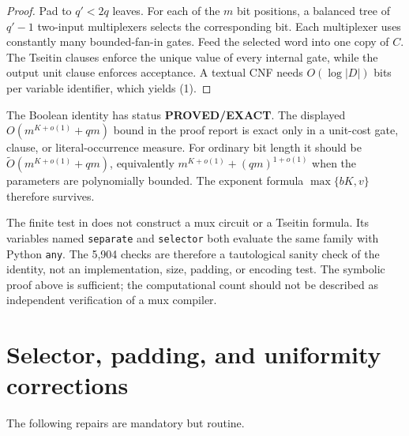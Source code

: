 \documentclass[11pt]{article}
\newcommand{\EXACT}{\textcolor{exact}{\textbf{PROVED/EXACT}}}
\begin{document}
\begin{proof}
Pad to $q'<2q$ leaves.  For each of the $m$ bit positions, a balanced tree of
$q'-1$ two-input multiplexers selects the corresponding bit.  Each
multiplexer uses constantly many bounded-fan-in gates.  Feed the selected word
into one copy of $C$.  The Tseitin clauses enforce the unique value of every
internal gate, while the output unit clause enforces acceptance.  A textual
CNF needs $O(\log |D|)$ bits per variable identifier, which yields (1).
\end{proof}

The Boolean identity has status \EXACT.  The displayed $O(m^{K+o(1)}+qm)$
bound in the proof report is exact only in a unit-cost gate, clause, or
literal-occurrence measure.  For ordinary bit length it should be
$\widetilde O(m^{K+o(1)}+qm)$, equivalently
$m^{K+o(1)}+(qm)^{1+o(1)}$ when the parameters are polynomially bounded.
The exponent formula $\max\{bK,v\}$ therefore survives.

The finite test in  does not construct
a mux circuit or a Tseitin formula.  Its variables named \texttt{separate}
and \texttt{selector} both evaluate the same family with Python
\texttt{any}.  The 5,904 checks are therefore a tautological sanity check of
the identity, not an implementation, size, padding, or encoding test.  The
symbolic proof above is sufficient; the computational count should not be
described as independent verification of a mux compiler.

\section{Selector, padding, and uniformity corrections}

The following repairs are mandatory but routine.
\end{document}
